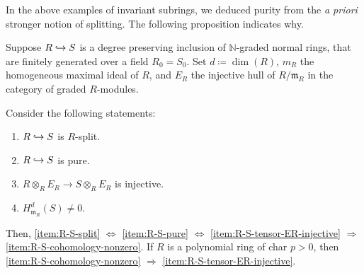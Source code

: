 \documentclass[12pt]{article}
\begin{document}
In the above examples of invariant subrings, we deduced purity from the \emph{a priori} stronger notion of splitting. The following proposition indicates why.

\begin{prop} \label{prop:purity-equivalence}
	Suppose $R \hookrightarrow S$ is a degree preserving inclusion of $\mathbb{N}$-graded normal rings, that are finitely generated over a field $R_{0} = S_{0}$. Set $d \coloneqq \dim(R)$, $m_{R}$ the homogeneous maximal ideal of $R$, and $E_{R}$ the injective hull of $R/\mathfrak{m}_{R}$ in the category of graded $R$-modules. 

	Consider the following statements:
	\begin{enumerate}[label=(\arabic*)]
		\item \label{item:R-S-split} $R \hookrightarrow S$ is $R$-split.
		\item \label{item:R-S-pure} $R \hookrightarrow S$ is pure.
		\item \label{item:R-S-tensor-ER-injective} $R \otimes_{R} E_{R} \to S \otimes_{R} E_{R}$ is injective.
		\item \label{item:R-S-cohomology-nonzero} $H_{\mathfrak{m}_{R}}^{d}(S) \neq 0$.
	\end{enumerate}

	Then, \ref{item:R-S-split} $\Leftrightarrow$ \ref{item:R-S-pure} $\Leftrightarrow$ \ref{item:R-S-tensor-ER-injective} $\Rightarrow$ \ref{item:R-S-cohomology-nonzero}. \newline
	If $R$ is a polynomial ring of char $p > 0$, then \ref{item:R-S-cohomology-nonzero} $\Rightarrow$ \ref{item:R-S-tensor-ER-injective}.
\end{prop}
\end{document}
